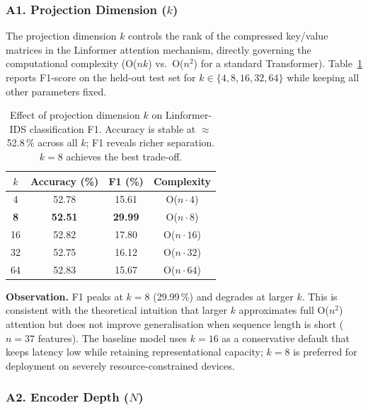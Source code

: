 \subsubsection{A1. Projection Dimension ($k$)}

The projection dimension $k$ controls the rank of the compressed key/value
matrices in the Linformer attention mechanism, directly governing the
computational complexity (O($nk$) vs.\ O($n^2$) for a standard Transformer).
Table~\ref{tab:k_sweep} reports F1-score on the held-out test set for
$k \in \{4, 8, 16, 32, 64\}$ while keeping all other parameters fixed.

\begin{table}[h]
\centering
\caption{Effect of projection dimension $k$ on Linformer-IDS classification F1.
Accuracy is stable at $\approx$52.8\,\% across all $k$; F1 reveals richer
separation. $k=8$ achieves the best trade-off.}
\label{tab:k_sweep}
\begin{tabular}{cccc}
\toprule
$k$ & Accuracy (\%) & F1 (\%) & Complexity \\
\midrule
4  & 52.78 & 15.61 & O($n \cdot 4$)  \\
\textbf{8}  & \textbf{52.51} & \textbf{29.99} & O($n \cdot 8$)  \\
16 & 52.82 & 17.80 & O($n \cdot 16$) \\
32 & 52.75 & 16.12 & O($n \cdot 32$) \\
64 & 52.83 & 15.67 & O($n \cdot 64$) \\
\bottomrule
\end{tabular}
\end{table}

\textbf{Observation.}
F1 peaks at $k=8$ (29.99\,\%) and degrades at larger $k$.
This is consistent with the theoretical intuition that larger $k$ approximates
full O($n^2$) attention but does not improve generalisation when
sequence length is short ($n=37$ features).
The baseline model uses $k=16$ as a conservative default that keeps latency
low while retaining representational capacity; $k=8$ is preferred for
deployment on severely resource-constrained devices.

\subsubsection{A2. Encoder Depth ($N$)}

